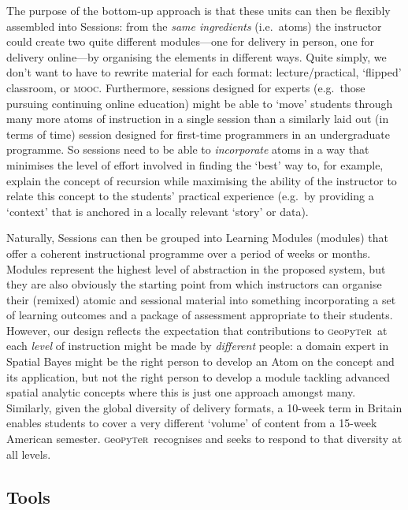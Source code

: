 \documentclass[letter, 11pt]{article}
\newcommand{\gp}{\textsc{g}eo\textsc{p}y\textsc{t}e\textsc{r}~\/}
\newcommand{\eg}{e.g.~\/}
\newcommand{\ie}{i.e.~\/}
\begin{document}
The purpose of the bottom-up approach is that these units can then be flexibly
assembled into Sessions: from the \textit{same ingredients} (\ie atoms) the
instructor could create two quite different modules---one for delivery in
person, one for delivery online---by organising the elements in different ways.
Quite simply, we don't want to have to rewrite material for each format:
lecture/practical, `flipped' classroom, or \textsc{mooc}. Furthermore, sessions
designed for experts (\eg those pursuing continuing online education) might be
able to `move' students through many more atoms of instruction in a single
session than a similarly laid out (in terms of time) session designed for
first-time programmers in an undergraduate programme. So sessions need to be
able to \emph{incorporate} atoms in a way that minimises the level of effort
involved in finding the `best' way to, for example, explain the concept of
recursion while maximising the ability of the instructor to relate this concept
to the students' practical experience (\eg by providing a `context' that is
anchored in a locally relevant `story' or data).

Naturally, Sessions can then be grouped into Learning Modules (modules) that
offer a coherent instructional programme over a period of weeks or months.
Modules represent the highest level of abstraction in the proposed system, but
they are also obviously the starting point from which instructors can organise
their (remixed) atomic and sessional material into something incorporating a set
of learning outcomes and a package of assessment appropriate to their students.
However, our design reflects the expectation that contributions to \gp at each
\emph{level} of instruction might be made by \emph{different} people: a domain
expert in Spatial Bayes might be the right person to develop an Atom on the
concept and its application, but not the right person to develop a module
tackling advanced spatial analytic concepts where this is just one approach
amongst many. Similarly, given the global diversity of delivery formats, a
10-week term in Britain enables students to cover a very different `volume' of
content from a 15-week American semester. \gp recognises and seeks to respond to
that diversity at all levels.

\subsection{Tools}\label{tools}
\end{document}

